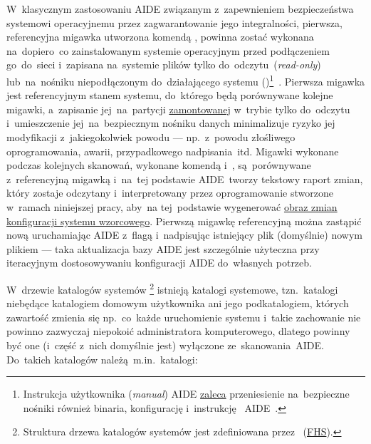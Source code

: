 \documentclass[thesis]{subfiles}
\begin{document}
W~klasycznym zastosowaniu AIDE związanym z~zapewnieniem bezpieczeństwa systemowi operacyjnemu przez zagwarantowanie jego integralności, pierwsza, referencyjna migawka utworzona komendą , powinna zostać wykonana na~dopiero~co zainstalowanym systemie operacyjnym przed podłączeniem go~do~sieci i~zapisana na~systemie plików tylko do~odczytu~(\emph{read-only}) lub~na~nośniku niepodłączonym do~działającego systemu ()\footnote{Instrukcja użytkownika (\emph{\gls{manual}}) AIDE \href{http://aide.sourceforge.net/stable/manual.html\#usage}{zaleca} przeniesienie na~bezpieczne nośniki również binaria, konfigurację i~instrukcję ~AIDE~\cite{aide-manual}.}~\cite{aide-manual}. Pierwsza migawka jest referencyjnym stanem systemu, do~którego będą porównywane kolejne migawki, a~zapisanie jej~na~partycji \href{https://linux.die.net/man/8/mount}{zamontowanej} w~trybie tylko do~odczytu i~umieszczenie jej~na~bezpiecznym nośniku danych minimalizuje ryzyko jej modyfikacji z~jakiegokolwiek powodu --- np.~z~powodu złośliwego oprogramowania, awarii, przypadkowego nadpisania~itd. Migawki wykonane podczas kolejnych skanowań, wykonane komendą  i~, są~porównywane z~referencyjną migawką i~na~tej podstawie AIDE~tworzy tekstowy raport zmian, który zostaje odczytany i~interpretowany przez oprogramowanie stworzone w~ramach niniejszej pracy, aby~na tej~podstawie wygenerować \hyperref[sec:obraz-zmian-konfiguracji]{obraz zmian konfiguracji systemu wzorcowego}. Pierwszą migawkę referencyjną można zastąpić nową uruchamiając AIDE z~flagą  i~nadpisując istniejący plik (domyślnie)  nowym plikiem  --- taka aktualizacja bazy AIDE jest szczególnie użyteczna przy iteracyjnym dostosowywaniu konfiguracji AIDE  do~własnych potrzeb.

W~drzewie katalogów systemów \footnote{Struktura drzewa katalogów systemów  jest zdefiniowana przez ~(\href{http://www.tldp.org/LDP/sag/html/fs-background.html}{FHS}).} istnieją katalogi systemowe, tzn.~katalogi niebędące katalogiem domowym użytkownika ani jego podkatalogiem, których zawartość zmienia się np.~co~każde uruchomienie systemu i~takie zachowanie nie powinno zazwyczaj niepokoić administratora komputerowego, dlatego powinny być one (i~część z~nich domyślnie jest) wyłączone ze~skanowania~AIDE. Do~takich katalogów należą~m.in.~katalogi:\mynobreakpar
\end{document}
